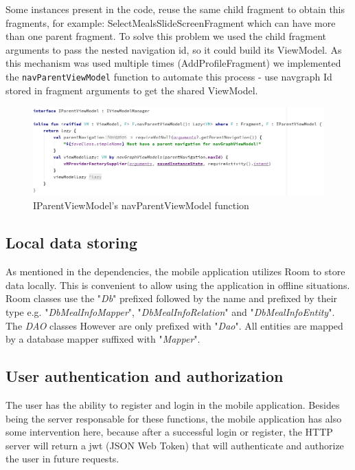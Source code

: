 Some instances present in the code, reuse the same child fragment to obtain this fragments, for example: SelectMealsSlideScreenFragment
which can have more than one parent fragment. To solve this problem we used the child fragment arguments to pass the nested navigation id,
so it could build its ViewModel. As this mechanism was used multiple times (AddProfileFragment) we implemented the \texttt{navParentViewModel} function
to automate this process - use navgraph Id stored in fragment arguments to get the shared ViewModel.\\

\begin{figure}[H]
    \begin{center}
        \includegraphics[scale=0.5]{_figures/IParentViewModel.png}
        \caption{IParentViewModel's navParentViewModel function}
    \end{center}
\end{figure}

\subsection{Local data storing}

As mentioned in the dependencies, the mobile application utilizes Room to store data locally. This is convenient
to allow using the application in offline situations.\\

Room classes use the "\textit{Db}" prefixed followed by the name and prefixed by their type e.g. "\textit{DbMealInfoMapper}", "\textit{DbMealInfoRelation}" and "\textit{DbMealInfoEntity}". 
The \textit{DAO} classes However are only prefixed with "\textit{Dao}". 
All entities are mapped by a database mapper suffixed with "\textit{Mapper}".

\subsection{User authentication and authorization}

The user has the ability to register and login in the mobile application. Besides being the server responsable for these functions, the mobile application has also some intervention
here, because after a successful login or register, the HTTP server will return a jwt (JSON Web Token) that will authenticate and authorize the user in future requests.\\

